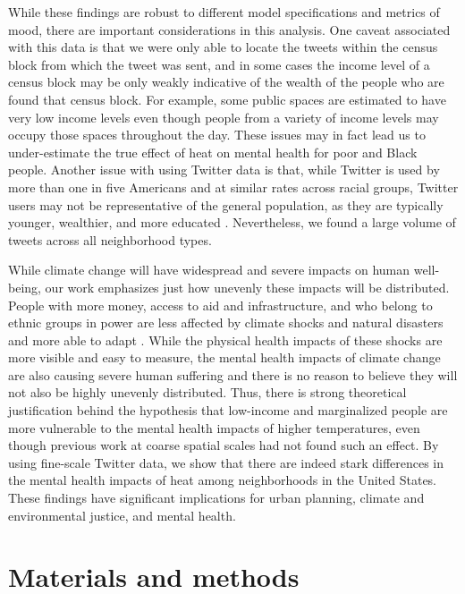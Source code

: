 \documentclass[9pt,twocolumn,twoside,lineno]{pnas-new}
\begin{document}
While these findings are robust to different model specifications and metrics of mood, there are important considerations in this analysis.  One caveat associated with this data is that we were only able to locate the tweets within the census block from which the tweet was sent, and in some cases the income level of a census block may be only weakly indicative of the wealth of the people who are found that census block. For example, some public spaces are estimated to have very low income levels even though people from a variety of income levels may occupy those spaces throughout the day. These issues may in fact lead us to under-estimate the true effect of heat on mental health for poor and Black people. Another issue with using Twitter data is that, while Twitter is used by more than one in five Americans and at similar rates across racial groups, Twitter users may not be representative of the general population, as they are typically younger, wealthier, and more educated \cite{Pew2020Sep}. Nevertheless, we found a large volume of tweets across all neighborhood types.

While climate change will have widespread and severe impacts on human well-being, our work emphasizes just how unevenly these impacts will be distributed. People with more money, access to aid and infrastructure, and who belong to ethnic groups in power are less affected by climate shocks and natural disasters and more able to adapt \cite{bullard2012wrong}. While the physical health impacts of these shocks are more visible and easy to measure, the mental health impacts of climate change are also causing severe human suffering and there is no reason to believe they will not also be highly unevenly distributed. Thus, there is strong theoretical justification behind the hypothesis that low-income and marginalized people are more vulnerable to the mental health impacts of higher temperatures, even though previous work at coarse spatial scales had not found such an effect. By using fine-scale Twitter data, we show that there are indeed stark differences in the mental health impacts of heat among neighborhoods in the United States. These findings have significant implications for urban planning, climate and environmental justice, and mental health.

\section*{Materials and methods}
\end{document}
